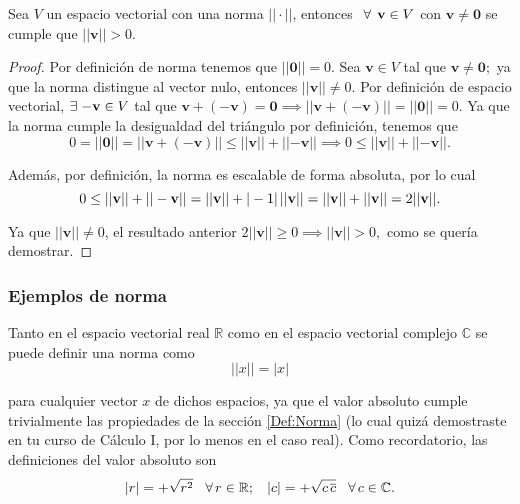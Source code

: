 \documentclass[12pt,dvipsnames]{article}
\newenvironment{corolario}[2][Corolario]{\begin{trivlist}
\item[\hskip \labelsep {\bfseries #1}]}{\end{trivlist}}
\begin{document}
\begin{corolario} {}
    Sea $V$ un espacio vectorial con una norma $||\cdot ||$, entonces $\hspace{1.5mm}\forall\hspace{1.5mm} \mathbf{v}\in V$ con $\mathbf{v}\neq\mathbf{0}$ se cumple que $||\mathbf{v}||>0.$

\begin{proof}
    Por definición de norma tenemos que $||\mathbf{0}||=0$. Sea $\mathbf{v}\in V$ tal que $\mathbf{v}\neq\mathbf{0};$ ya que la norma distingue al vector nulo, entonces $||\mathbf{v}||\neq 0.$ Por definición de espacio vectorial, $\exists\hspace{1mm} \mathbf{-v}\in V$ tal que $\mathbf{v}+(-\mathbf{v})=\mathbf{0}\implies ||\mathbf{v}+(-\mathbf{v})||=||\mathbf{0}||=0$. Ya que la norma cumple la desigualdad del triángulo por definición, tenemos que $$0=||\mathbf{0}||=||\mathbf{v}+(-\mathbf{v})||\leq ||\mathbf{v}||+||\mathbf{-v}||\implies 0\leq ||\mathbf{v}||+||\mathbf{-v}||.$$

\noindent Además, por definición, la norma es escalable de forma absoluta, por lo cual $$0\leq ||\mathbf{v}||+||-\mathbf{v}||=||\mathbf{v}||+|-1|\hspace{0.5mm} ||\mathbf{v}||=||\mathbf{v}||+||\mathbf{v}||=2||\mathbf{v}||.$$

\noindent Ya que $||\mathbf{v}||\neq 0$, el resultado anterior $2||\mathbf{v}||\geq 0\implies ||\mathbf{v}||>0,$ como se quería demostrar.

\end{proof}

\end{corolario}

\subsubsection{Ejemplos de norma}

Tanto en el espacio vectorial real $\mathbb{R}$ como en el espacio vectorial complejo $\mathbb{C}$ se puede definir una norma como $$||x|| = |x|$$

\noindent para cualquier vector $x$ de dichos espacios, ya que el valor absoluto cumple trivialmente las propiedades de la sección \ref{Def:Norma} (lo cual quizá demostraste en tu curso de Cálculo I, por lo menos en el caso real). Como recordatorio, las definiciones del valor absoluto son $$|r| = +\sqrt{r^2} \hspace{3mm}\forall\hspace{0.5mm}r\in\mathbb{
R}; \hspace{3mm} |c| = +\sqrt{c\hspace{0.5mm}\overline{c}}\hspace{3mm}\forall\hspace{0.5mm}c\in\mathbb{C}.$$
\end{document}

